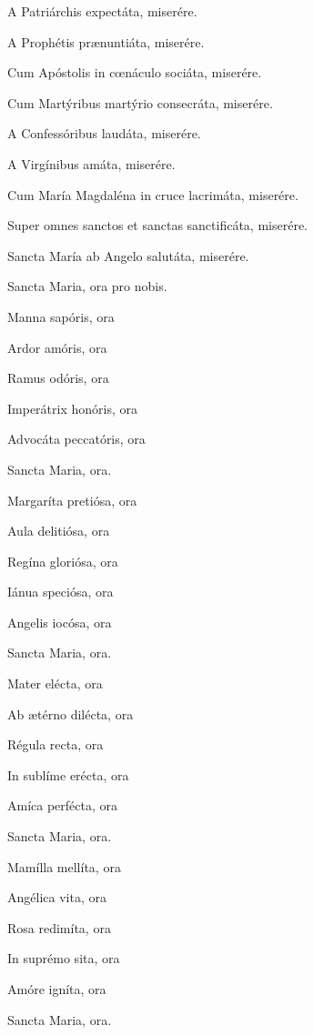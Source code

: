 \documentclass[12pt,a6paper]{book}
\begin{document}
\begin{sloppy}
A Patriárchis expectáta, miserére.

A Prophétis prænuntiáta, miserére.

Cum Apóstolis in cœnáculo sociáta, miserére.

Cum Martýribus martýrio consecráta, miserére.

A Confessóribus laudáta, miserére.

A Virgínibus amáta, miserére.

Cum María Magdaléna in cruce lacrimáta, miserére.

Super omnes sanctos et sanctas sanctificáta, miserére.

Sancta María ab Angelo salutáta, miserére.

Sancta Maria, ora pro nobis.

Manna sapóris, ora

Ardor amóris, ora

Ramus odóris, ora

Imperátrix honóris, ora

Advocáta peccatóris, ora

Sancta Maria, ora.

\vspace{3mm}


Margaríta pretiósa, ora

Aula delitiósa, ora

Regína gloriósa, ora

Iánua speciósa, ora

Angelis iocósa, ora

Sancta Maria, ora.

\vspace{3mm}

Mater elécta, ora

Ab ætérno dilécta, ora

Régula recta, ora

In sublíme erécta, ora

Amíca perfécta, ora

Sancta Maria, ora.

\vspace{3mm}

Mamílla mellíta, ora

Angélica vita, ora

Rosa redimíta, ora

In suprémo sita, ora

Amóre igníta, ora

Sancta Maria, ora.

\vspace{3mm}


\end{sloppy}
\end{document}

